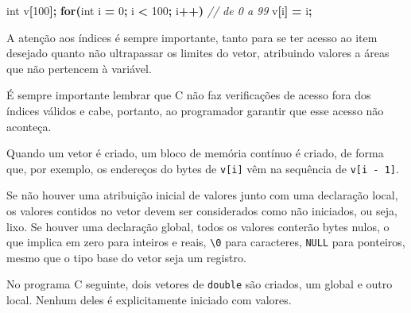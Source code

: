 \documentclass[
  11pt,
  a4paper,
]{scrbook}
\newenvironment{Shaded}{\begin{snugshade}}{\end{snugshade}}
\newcommand{\CommentTok}[1]{\textcolor[rgb]{0.56,0.35,0.01}{\textit{#1}}}
\newcommand{\ControlFlowTok}[1]{\textcolor[rgb]{0.13,0.29,0.53}{\textbf{#1}}}
\newcommand{\DataTypeTok}[1]{\textcolor[rgb]{0.13,0.29,0.53}{#1}}
\newcommand{\DecValTok}[1]{\textcolor[rgb]{0.00,0.00,0.81}{#1}}
\newcommand{\NormalTok}[1]{#1}
\newcommand{\OperatorTok}[1]{\textcolor[rgb]{0.81,0.36,0.00}{\textbf{#1}}}
\begin{document}
\begin{Shaded}
\begin{Highlighting}[]
\DataTypeTok{int}\NormalTok{ v}\OperatorTok{[}\DecValTok{100}\OperatorTok{];}
\ControlFlowTok{for}\OperatorTok{(}\DataTypeTok{int}\NormalTok{ i }\OperatorTok{=} \DecValTok{0}\OperatorTok{;}\NormalTok{ i }\OperatorTok{\textless{}} \DecValTok{100}\OperatorTok{;}\NormalTok{ i}\OperatorTok{++)}  \CommentTok{// de 0 a 99}
\NormalTok{    v}\OperatorTok{[}\NormalTok{i}\OperatorTok{]} \OperatorTok{=}\NormalTok{ i}\OperatorTok{;}
\end{Highlighting}
\end{Shaded}

\begin{tcolorbox}[enhanced jigsaw, arc=.35mm, bottomtitle=1mm, colbacktitle=quarto-callout-tip-color!10!white, title=\textcolor{quarto-callout-tip-color}{\faLightbulb}\hspace{0.5em}{Dica}, toprule=.15mm, left=2mm, opacityback=0, colback=white, colframe=quarto-callout-tip-color-frame, opacitybacktitle=0.6, bottomrule=.15mm, leftrule=.75mm, toptitle=1mm, coltitle=black, titlerule=0mm, rightrule=.15mm, breakable]

A atenção aos índices é sempre importante, tanto para se ter acesso ao
item desejado quanto não ultrapassar os limites do vetor, atribuindo
valores a áreas que não pertencem à variável.

É sempre importante lembrar que C não faz verificações de acesso fora
dos índices válidos e cabe, portanto, ao programador garantir que esse
acesso não aconteça.

\end{tcolorbox}

Quando um vetor é criado, um bloco de memória contínuo é criado, de
forma que, por exemplo, os endereços do bytes de \texttt{v{[}i{]}} vêm
na sequência de \texttt{v{[}i\ -\ 1{]}}.

Se não houver uma atribuição inicial de valores junto com uma declaração
local, os valores contidos no vetor devem ser considerados como não
iniciados, ou seja, lixo. Se houver uma declaração global, todos os
valores conterão bytes nulos, o que implica em zero para inteiros e
reais, \texttt{\textbackslash{}0} para caracteres, \texttt{NULL} para
ponteiros, mesmo que o tipo base do vetor seja um registro.

No programa C seguinte, dois vetores de \texttt{double} são criados, um
global e outro local. Nenhum deles é explicitamente iniciado com
valores.
\end{document}

